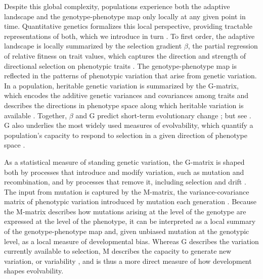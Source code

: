 Despite this global complexity, populations experience both the adaptive landscape and the genotype-phenotype map only locally at any given point in time.
Quantitative genetics formalizes this local perspective, providing tractable representations of both, which we introduce in turn \parencite{lynch1998genetics, melo2016modularity}.
To first order, the adaptive landscape is locally summarized by the selection gradient $\beta$, the partial regression of relative fitness on trait values, which captures the direction and strength of directional selection on phenotypic traits \parencite{lande1979quantitative, Lande1983-lf}.
The genotype-phenotype map is reflected in the patterns of phenotypic variation that arise from genetic variation.
In a population, heritable genetic variation is summarized by the G-matrix, which encodes the additive genetic variances and covariances among traits and describes the directions in phenotype space along which heritable variation is available \parencite{Schluter1996-uo, hansen2008measuring}.
Together, $\beta$ and G predict short-term evolutionary change \parencite{lande1979quantitative}; but see \cite{milocco2020evolution, rice2002general}.
G also underlies the most widely used measures of evolvability, which quantify a population's capacity to respond to selection in a given direction of phenotype space \parencite{hansen2008measuring, Hansen2023-evolvability}.

As a statistical measure of standing genetic variation, the G-matrix is shaped both by processes that introduce and modify variation, such as mutation and recombination, and by processes that remove it, including selection and drift \parencite{jones2004evolution, melo2015directional}.
The input from mutation is captured by the M-matrix, the variance-covariance matrix of phenotypic variation introduced by mutation each generation \parencite{jones2007mutation, Jones2014-wj}.
Because the M-matrix describes how mutations arising at the level of the genotype are expressed at the level of the phenotype, it can be interpreted as a local summary of the genotype-phenotype map and, given unbiased mutation at the genotypic level, as a local measure of developmental bias.
Whereas G describes the variation currently available to selection, M describes the capacity to generate new variation, or variability \parencite{wagner1996perspective}, and is thus a more direct measure of how development shapes evolvability.

